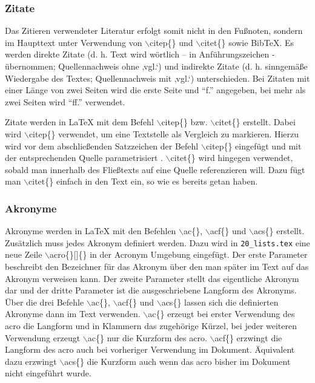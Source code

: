 \subsubsection{Zitate}
Das Zitieren verwendeter Literatur erfolgt somit nicht in den Fußnoten, sondern im Haupttext unter Verwendung von $\backslash$citep\{\} und $\backslash$citet\{\} sowie BibTeX. Es werden direkte Zitate (d. h. Text wird wörtlich – in Anführungszeichen - übernommen; Quellennachweis ohne ‚vgl.‘) und indirekte Zitate (d. h. sinngemäße Wiedergabe des Textes; Quellennachweis mit ‚vgl.‘) unterschieden. Bei Zitaten mit einer Länge von zwei Seiten wird die erste Seite und "`f."' angegeben, bei mehr als zwei Seiten wird "`ff."' verwendet. 

Zitate werden in \LaTeX{} mit dem Befehl $\backslash$citep\{\} bzw. $\backslash$citet\{\} erstellt. Dabei wird $\backslash$citep\{\} verwendet, um eine Textstelle als Vergleich zu markieren. Hierzu wird vor dem abschließenden Satzzeichen der Befehl $\backslash$citep\{\} eingefügt und mit der entsprechenden Quelle parametrisiert \citep{Example2019}. $\backslash$citet\{\} wird hingegen verwendet, sobald man innerhalb des Fließtexts auf eine Quelle referenzieren will. Dazu fügt man $\backslash$citet\{\} einfach in den Text ein, \glqq so wie es bereits \citet[][]{Example2019} getan haben\grqq.

\subsubsection{Akronyme}
Akronyme werden in \LaTeX{} mit den Befehlen $\backslash$ac\{\}, $\backslash$acf\{\} und $\backslash$acs\{\} erstellt. Zusätzlich muss jedes Akronym definiert werden. Dazu wird in \lstinline{20_lists.tex} eine neue Zeile $\backslash$acro\{\}[]\{\} in der Acronym Umgebung eingefügt. Der erste Parameter beschreibt den Bezeichner für das Akronym über den man später im Text auf das Akronym verweisen kann. Der zweite Parameter stellt das eigentliche Akronym dar und der dritte Parameter ist die ausgeschriebene Langform des Akronyms. Über die drei Befehle $\backslash$ac\{\}, $\backslash$acf\{\} und $\backslash$acs\{\} lassen sich die definierten Akronyme dann im Text verwenden. $\backslash$ac\{\} erzeugt bei erster Verwendung des \ac{acro} die Langform und in Klammern das zugehörige Kürzel, bei jeder weiteren Verwendung erzeugt $\backslash$ac\{\} nur die Kurzform des \ac{acro}. $\backslash$acf\{\} erzwingt die Langform des \acf{acro} auch bei vorheriger Verwendung im Dokument. Äquivalent dazu erzwingt $\backslash$acs\{\} die Kurzform auch wenn das \acs{acro} bisher im Dokument nicht eingeführt wurde.
